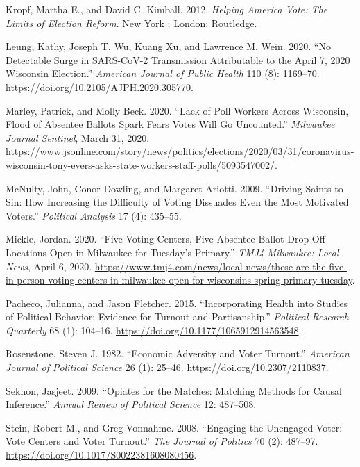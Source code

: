 \documentclass[
  12pt,
]{article}
\newlength{\cslhangindent}
\newenvironment{cslreferences}%
  {\setlength{\parindent}{0pt}%
  \everypar{\setlength{\hangindent}{\cslhangindent}}\ignorespaces}%
  {\par}
\begin{document}
\begin{cslreferences}
\leavevmode\hypertarget{ref-Kropf2012}{}%
Kropf, Martha E., and David C. Kimball. 2012. \emph{Helping America Vote: The Limits of Election Reform}. New York ; London: Routledge.

\leavevmode\hypertarget{ref-Leung2020}{}%
Leung, Kathy, Joseph T. Wu, Kuang Xu, and Lawrence M. Wein. 2020. ``No Detectable Surge in SARS-CoV-2 Transmission Attributable to the April 7, 2020 Wisconsin Election.'' \emph{American Journal of Public Health} 110 (8): 1169--70. \url{https://doi.org/10.2105/AJPH.2020.305770}.

\leavevmode\hypertarget{ref-Marley2020}{}%
Marley, Patrick, and Molly Beck. 2020. ``Lack of Poll Workers Across Wisconsin, Flood of Absentee Ballots Spark Fears Votes Will Go Uncounted.'' \emph{Milwaukee Journal Sentinel}, March 31, 2020. \url{https://www.jsonline.com/story/news/politics/elections/2020/03/31/coronavirus-wisconsin-tony-evers-asks-state-workers-staff-polls/5093547002/}.

\leavevmode\hypertarget{ref-McNulty2009}{}%
McNulty, John, Conor Dowling, and Margaret Ariotti. 2009. ``Driving Saints to Sin: How Increasing the Difficulty of Voting Dissuades Even the Most Motivated Voters.'' \emph{Political Analysis} 17 (4): 435--55.

\leavevmode\hypertarget{ref-Mickle2020}{}%
Mickle, Jordan. 2020. ``Five Voting Centers, Five Absentee Ballot Drop-Off Locations Open in Milwaukee for Tuesday's Primary.'' \emph{TMJ4 Milwaukee: Local News}, April 6, 2020. \url{https://www.tmj4.com/news/local-news/these-are-the-five-in-person-voting-centers-in-milwaukee-open-for-wisconsins-spring-primary-tuesday}.

\leavevmode\hypertarget{ref-Pacheco2015}{}%
Pacheco, Julianna, and Jason Fletcher. 2015. ``Incorporating Health into Studies of Political Behavior: Evidence for Turnout and Partisanship.'' \emph{Political Research Quarterly} 68 (1): 104--16. \url{https://doi.org/10.1177/1065912914563548}.

\leavevmode\hypertarget{ref-Rosenstone1982}{}%
Rosenstone, Steven J. 1982. ``Economic Adversity and Voter Turnout.'' \emph{American Journal of Political Science} 26 (1): 25--46. \url{https://doi.org/10.2307/2110837}.

\leavevmode\hypertarget{ref-Sekhon2009}{}%
Sekhon, Jasjeet. 2009. ``Opiates for the Matches: Matching Methods for Causal Inference.'' \emph{Annual Review of Political Science} 12: 487--508.

\leavevmode\hypertarget{ref-Stein2008}{}%
Stein, Robert M., and Greg Vonnahme. 2008. ``Engaging the Unengaged Voter: Vote Centers and Voter Turnout.'' \emph{The Journal of Politics} 70 (2): 487--97. \url{https://doi.org/10.1017/S0022381608080456}.


\end{cslreferences}
\end{document}
